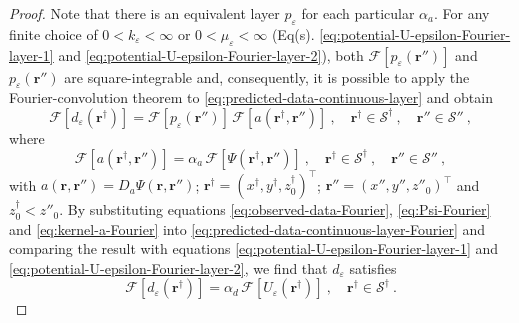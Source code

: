 \begin{proof}
	Note that there is an equivalent layer $p_{\varepsilon}$ for each particular $\alpha_{a}$.
	For any finite choice of $0 < k_{\varepsilon} < \infty$ or $0 < \mu_{\varepsilon} < \infty$
	(Eq(s). \ref{eq:potential-U-epsilon-Fourier-layer-1} and \ref{eq:potential-U-epsilon-Fourier-layer-2}), 
	both $\mathcal{F} [ p_{\varepsilon}(\mathbf{r}'') ]$ 
	and $p_{\varepsilon}(\mathbf{r}'')$ are square-integrable and, consequently, it is possible to
	apply the Fourier-convolution theorem to \ref{eq:predicted-data-continuous-layer} and obtain
	\begin{equation}
		\mathcal{F} [ d_{\varepsilon}(\mathbf{r}^{\dagger}) ] =
		\mathcal{F} [ p_{\varepsilon}(\mathbf{r}'') ] \, 
		\mathcal{F} [ a(\mathbf{r}^{\dagger}, \mathbf{r}'') ] \: ,
		\quad \mathbf{r}^{\dagger} \in \mathcal{S}^{\dagger} \: ,
		\quad \mathbf{r}'' \in \mathcal{S}'' \: ,
		\label{eq:predicted-data-continuous-layer-Fourier}
	\end{equation}
	where 
	\begin{equation}
		\mathcal{F} [ a(\mathbf{r}^{\dagger}, \mathbf{r}'') ] = \alpha_{a} \, \mathcal{F} [ \Psi(\mathbf{r}^{\dagger}, \mathbf{r}'') ] \: ,
		\quad \mathbf{r}^{\dagger} \in \mathcal{S}^{\dagger} \: ,
		\quad \mathbf{r}'' \in \mathcal{S}'' \: ,
		\label{eq:kernel-a-Fourier}
	\end{equation}
	with $a(\mathbf{r}, \mathbf{r}'') = D_{a} \Psi(\mathbf{r}, \mathbf{r}'')$;
	$\mathbf{r}^{\dagger} = (x^{\dagger}, y^{\dagger}, z^{\dagger}_{0})^{\top}$; 
	$\mathbf{r}'' = (x'', y'', z''_{0})^{\top}$ and $z^{\dagger}_{0} < z''_{0}$.
	By substituting equations \ref{eq:observed-data-Fourier}, \ref{eq:Psi-Fourier} and \ref{eq:kernel-a-Fourier} 
	into \ref{eq:predicted-data-continuous-layer-Fourier} and comparing the result with equations 
	\ref{eq:potential-U-epsilon-Fourier-layer-1} and \ref{eq:potential-U-epsilon-Fourier-layer-2}, 
	we find that $d_{\varepsilon}$ satisfies
	\begin{equation}
		\mathcal{F} [ d_{\varepsilon}(\mathbf{r}^{\dagger}) ] = 
		\alpha_{d} \,
		\mathcal{F} [ U_{\varepsilon}(\mathbf{r}^{\dagger}) ] \: ,
		\quad \mathbf{r}^{\dagger} \in \mathcal{S}^{\dagger} \: .
		\label{eq:predicted-data-continuous-layer-epsilon-Fourier}
	\end{equation}


\end{proof}
